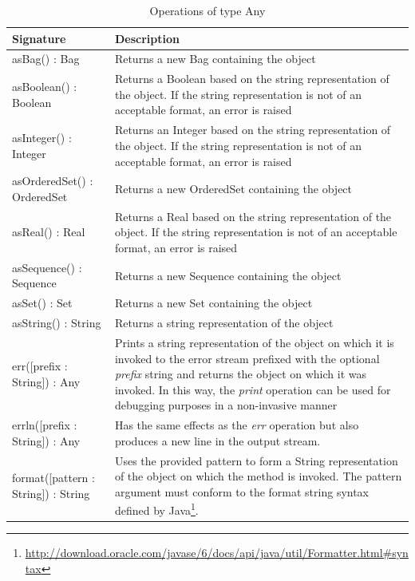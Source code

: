\begin{longtabu} {|p{6.5cm}|X|}
\caption{Operations of type Any}
\label{tab:AnyOperations}\\
\hline
    \textbf{Signature} & \textbf{Description} \\\hline

    asBag() : Bag & Returns a new Bag containing the object \\\hline
    
    asBoolean() : Boolean & Returns a Boolean based on the string representation of the object. If the string representation is not of an acceptable format, an error is raised \\\hline
    
    asInteger() : Integer & Returns an Integer based on the string representation of the object. If the string representation is not of an acceptable format, an error is raised \\\hline
    
    asOrderedSet() : OrderedSet & Returns a new OrderedSet containing the object \\\hline
    
    asReal() : Real & Returns a Real based on the string representation of the object. If the string representation is not of an acceptable format, an error is raised \\\hline
    
    asSequence() : Sequence & Returns a new Sequence containing the object \\\hline
    
    asSet() : Set & Returns a new Set containing the object \\\hline
    
    asString() : String & Returns a string representation of the object \\\hline
    
    err([prefix : String]) : Any & Prints a string representation of the object on which it is invoked to the error stream prefixed with the optional \emph{prefix} string and returns the object on which it was invoked. In this way, the \emph{print} operation can be used for debugging purposes in a non-invasive manner\\\hline
    
    errln([prefix : String]) : Any & Has the same effects as the \emph{err} operation but also produces a new line in the output stream. \\\hline
    
    format([pattern : String]) : String & Uses the provided pattern to form a String representation of the object on which the method is invoked. The pattern argument must conform to the format string syntax defined by Java\footnote{\url{http://download.oracle.com/javase/6/docs/api/java/util/Formatter.html\#syntax}}. \\\hline
    

\end{longtabu}

